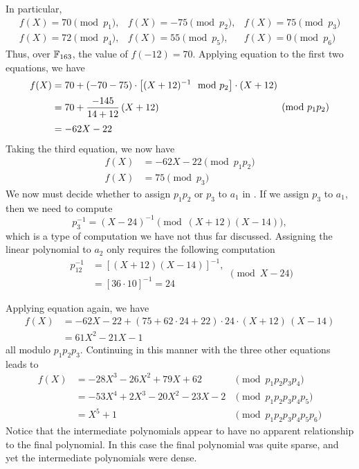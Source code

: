 In particular,
\begin{equation} \label{Interp:Newt:Prop:Eq}
\begin{array}{lll}
  f(X) = 70 \pmod{p_1},& f(X) = -75 \pmod{p_2},&
  f(X) = 75 \pmod{p_3} \\
  f(X) =72 \pmod{p_4},& f(X) = 55 \pmod{p_5},&
  f(X) = 0 \pmod{p_6}
\end{array}
\end{equation}
Thus, over $\mathbb{F}_{163}$, the value of $f(-12)= 70$.  Applying equation
 to the first two equations, we
have
\[
\begin{aligned}
  f(X)& = 70 + (-70 -75) \cdot \left[(X+12)^{-1} \mod p_2\right] \cdot
   (X+12) \\[2pt]
    &= 70 + {-145 \over 14+12} \, (X + 12)\\[2pt]
    &= -62 X - 22
\end{aligned}
\pmod{p_1 p_2}
\]
Taking the third equation, we now have
\[
\begin{aligned}
f(X) & =  -62 X - 22 \pmod{p_1 p_2} \\
f(X) & = 75 \pmod{p_3}
\end{aligned}
\]
We now must decide whether to assign $p_1 p_2$ or $p_3$ to $a_1$ in
. If we assign $p_3$ to $a_1$, then
we need to compute
\[
p_3^{-1} = (X-24)^{-1} \pmod{(X+12)(X-14)},
\]
which is a type of computation we have not thus far discussed.
Assigning the linear polynomial to $a_2$ only requires the following
computation
\[
\begin{aligned}
p_{12}^{-1} &= \left[(X+12)(X-14)\right]^{-1}, \\
  & = \left[36 \cdot 10\right]^{-1} = 24 
\end{aligned}
 \pmod{X-24}
\]

Applying equation  again, we have
\[
\begin{aligned}
  f(X)&= -62 X - 22 + 
     (75 + 62 \cdot 24 + 22) \cdot 24 \cdot (X + 12) \, (X - 14)\\[3pt]
    &= 61 X^2 - 21 X - 1 
\end{aligned}
\]
all modulo $p_1 p_2 p_3$.
Continuing in this manner with the three other equations leads to
\[
\begin{array}{rll}
f(X) &= -28 X^3 - 26 X^2 + 79X + 62 &\pmod{p_1 p_2 p_3 p_4} \\[3pt]
  &= -53 X^4 + 2 X^3 - 20X^2 - 23 X -2 &\pmod{p_1 p_2 p_3 p_4 p_5} \\[3pt]
  &= X^5 + 1  &\pmod{p_1 p_2 p_3 p_4 p_5 p_6}
\end{array}
\]
Notice that the intermediate polynomials appear to have no apparent
relationship to the final polynomial.  In this case the final polynomial
was quite sparse, and yet the intermediate polynomials were dense.

